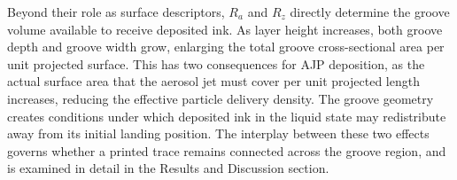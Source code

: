 Beyond their role as surface descriptors, $R_a$ and $R_z$ directly determine the groove volume available to receive deposited ink. As layer height increases, both groove depth and groove width grow, enlarging the total groove cross-sectional area per unit projected surface. This has two consequences for AJP deposition, as the actual surface area that the aerosol jet must cover per unit projected length increases, reducing the effective particle delivery density. The groove geometry creates conditions under which deposited ink in the liquid state may redistribute away from its initial landing position. The interplay between these two effects governs whether a printed trace remains connected across the groove region, and is examined in detail in the Results and Discussion section.